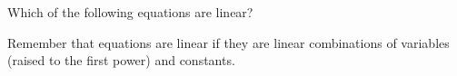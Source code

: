 \documentclass{ximera}
\author{Zack Reed}
\begin{document}
\begin{exercise}

  Which of the following equations are linear?
  \begin{selectAll}
  \end{selectAll}

  \begin{hint}
    Remember that equations are linear if they are linear combinations of variables (raised to the first power) and constants.
  \end{hint}

\end{exercise}
\end{document}
